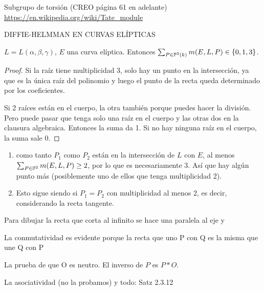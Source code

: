 \documentclass[CR.tex]{subfiles}
\begin{document}
Subgrupo de torsión (CREO página 61 en adelante) \url{https://en.wikipedia.org/wiki/Tate_module}

DIFFIE-HELMMAN EN CURVAS ELÍPTICAS

\begin{lemma}[Satz 2.3.8]
$L=L(\alpha,\beta,\gamma)$, $E$ una curva elíptica. Entonces $\sum_{P\in\mathbb{P}^2(k)}m(E,L,P)\in\{0,1,3\}$.
\end{lemma}
\begin{proof}
Si la raíz tiene multiplicidad 3, solo hay un punto en la intersección, ya que es la única raíz del polinomio y luego el punto de la recta queda determinado por los coeficientes. 


Si 2 raíces están en el cuerpo, la otra también porque puedes hacer la división. Pero puede pasar que tenga solo una raíz en el cuerpo y las otras dos en la clausura algebraica. Entonces la suma da 1. Si no hay ninguna raíz en el cuerpo, la suma sale 0. 
\end{proof}

\begin{coro}[Korollar 2.3.9]
\begin{enumerate}
\item como tanto $P_1$ como $P_2$ están en la intersección de $L$ con $E$, al menos $\sum_{P\in\mathbb{P}^2}m(E,L,P)\geq 2$, por lo que es necesariamente 3. Así que hay algún punto más (posiblemente uno de ellos que tenga multiplicidad 2). 
\item Esto sigue siendo si $P_1=P_2$ con multiplicidad al menos 2, es decir, considerando la recta tangente. 
\end{enumerate}
\end{coro}

\begin{defi}[Definition 2.3.10]

\end{defi}
Para dibujar la recta que corta al infinito se hace una paralela al eje y

La conmutatividad es evidente porque la recta que uno P con Q es la misma que une Q con P


La prueba de que O es neutro. El inverso de $P$ es $P*O$. 


La asociatividad (no la probamos) y todo: Satz 2.3.12
\end{document}

